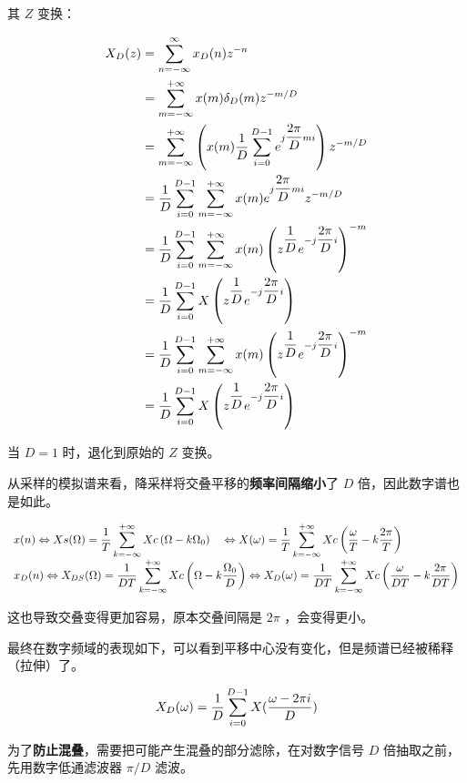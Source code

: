 \documentclass[cn,11pt,chinese,black,simple]{elegantbook}
\begin{document}
其 \(Z\) 变换：

\[\begin{aligned}
    X_D(z) &= \displaystyle\sum_{n=-\infty}^\infty x_D(n) z^{-n} \\ 
    &=\displaystyle\sum_{m=-\infty}^{+\infty} x(m) \delta_{D}(m) z^{-m / D} \\
    &=\displaystyle\sum_{m=-\infty}^{+\infty}\left(x(m) \dfrac{1}{D} \displaystyle\sum_{i=0}^{D-1} e^{j \dfrac{2 \pi}{D} m i}\right) z^{-m / D} \\
    &=\dfrac{1}{D} \displaystyle\sum_{i=0}^{D-1} \displaystyle\sum_{m=-\infty}^{+\infty} x(m) e^{j \dfrac{2 \pi}{D} m i} z^{-m / D} \\
    &=\dfrac{1}{D} \displaystyle\sum_{i=0}^{D-1} \displaystyle\sum_{m=-\infty}^{+\infty} x(m)\left(z^{\dfrac{1}{D}} e^{-j \dfrac{2 \pi}{D} i}\right)^{-m} \\
    &=\dfrac{1}{D} \displaystyle\sum_{i=0}^{D-1} X\left(z^{\dfrac{1}{D}} e^{-j \dfrac{2 \pi}{D} i}\right) \\
    &=\dfrac{1}{D} \displaystyle\sum_{i=0}^{D-1} \displaystyle\sum_{m=-\infty}^{+\infty} x(m)\left(z^{\dfrac{1}{D}} e^{-j \dfrac{2 \pi}{D} i}\right)^{-m} \\
    &=\dfrac{1}{D} \displaystyle\sum_{i=0}^{D-1} X\left(z^{\dfrac{1}{D}} e^{-j \dfrac{2 \pi}{D} i}\right)
\end{aligned}\]


当 \(D = 1\) 时，退化到原始的 \(Z\) 变换。

从采样的模拟谱来看，降采样将交叠平移的\textbf{频率间隔缩小}了 \(D\) 倍，因此数字谱也是如此。

\[
\begin{array}{l}
x(n) \Leftrightarrow X s(\Omega)=\dfrac{1}{T} \displaystyle\sum_{k=-\infty}^{+\infty} X c\left(\Omega-k \Omega_{0}\right) \quad \Leftrightarrow X(\omega)=\dfrac{1}{T} \displaystyle\sum_{k=-\infty}^{+\infty} X c\left(\dfrac{\omega}{T}-k \dfrac{2 \pi}{T}\right) \\
x_{D}(n) \Leftrightarrow X_{D S}(\Omega)=\dfrac{1}{D T} \displaystyle\sum_{k=-\infty}^{+\infty} X c\left(\Omega-k \dfrac{\Omega_{0}}{D}\right) \Leftrightarrow X_{D}(\omega)=\dfrac{1}{D T} \displaystyle\sum_{k=-\infty}^{+\infty} X c\left(\dfrac{\omega}{D T}-k \dfrac{2 \pi}{D T}\right)
\end{array}
\]

这也导致交叠变得更加容易，原本交叠间隔是 \(2 \pi\) ，会变得更小。

最终在数字频域的表现如下，可以看到平移中心没有变化，但是频谱已经被稀释（拉伸）了。

\[X_D(\omega) = \dfrac{1}{D} \displaystyle\sum_{i = 0 }^{D-1} X(\dfrac{\omega - 2 \pi i}{D})\] 

为了\textbf{防止混叠}，需要把可能产生混叠的部分滤除，在对数字信号 \(D\) 倍抽取之前，先用数字低通滤波器 \(\pi / D\) 滤波。
\end{document}

